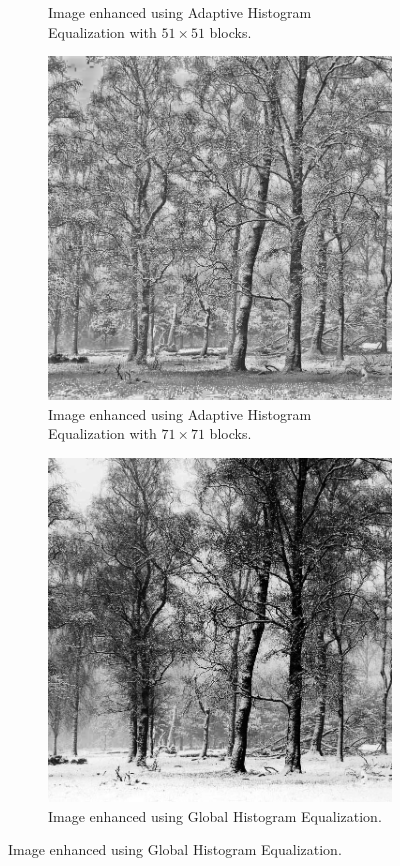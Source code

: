 \documentclass[a4paper, landscape]{article}
\begin{document}
\begin{figure}
\begin{subfigure}{0.32\linewidth}
        \caption{Image enhanced using Adaptive Histogram Equalization with $51\times 51$ blocks.}
    \end{subfigure}
    \begin{subfigure}{0.32\linewidth}
        \centering
        \includegraphics[width=0.9\linewidth]{chonky_enhanced_LC2.png}
        \caption{Image enhanced using Adaptive Histogram Equalization with $71\times 71$ blocks.}
    \end{subfigure}
    \begin{subfigure}{0.32\linewidth}
        \centering
        \includegraphics[width=0.9\linewidth]{global_histogram_LC2.jpg}
		\caption{Image enhanced using Global Histogram Equalization.}
    \end{subfigure}
\end{figure}
\end{document}
